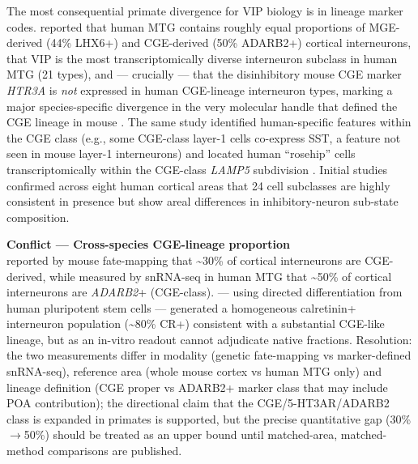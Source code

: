 \documentclass[11pt]{article}
\let\origrightarrow\rightarrow
\def\rightarrow{\ensuremath{\origrightarrow}}
\begin{document}
The most consequential primate divergence for VIP biology is in lineage marker codes. \citet{Hodge2019} reported that human MTG contains roughly equal proportions of MGE-derived (44\% LHX6+) and CGE-derived (50\% ADARB2+) cortical interneurons, that VIP is the most transcriptomically diverse interneuron subclass in human MTG (21 types), and --- crucially --- that the disinhibitory mouse CGE marker \textit{HTR3A} is \textit{not} expressed in human CGE-lineage interneuron types, marking a major species-specific divergence in the very molecular handle that defined the CGE lineage in mouse \citep{Hodge2019}. The same study identified human-specific features within the CGE class (e.g., some CGE-class layer-1 cells co-express SST, a feature not seen in mouse layer-1 interneurons) and located human ``rosehip'' cells transcriptomically within the CGE-class \textit{LAMP5} subdivision \citep{Hodge2019}. Initial studies \citep{Jorstad2023b} confirmed across eight human cortical areas that 24 cell subclasses are highly consistent in presence but show areal differences in inhibitory-neuron sub-state composition.

\begin{framed}
\textbf{Conflict --- Cross-species CGE-lineage proportion}\\
\citet{Miyoshi2010} reported by mouse fate-mapping that {\textasciitilde}30\% of cortical interneurons are CGE-derived, while \citet{Hodge2019} measured by snRNA-seq in human MTG that {\textasciitilde}50\% of cortical interneurons are \textit{ADARB2}+ (CGE-class). \citet{Du2025} --- using directed differentiation from human pluripotent stem cells --- generated a homogeneous calretinin+ interneuron population ({\textasciitilde}80\% CR+) consistent with a substantial CGE-like lineage, but as an in-vitro readout cannot adjudicate native fractions. Resolution: the two measurements differ in modality (genetic fate-mapping vs marker-defined snRNA-seq), reference area (whole mouse cortex vs human MTG only) and lineage definition (CGE proper vs ADARB2+ marker class that may include POA contribution); the directional claim that the CGE/5-HT3AR/ADARB2 class is expanded in primates is supported, but the precise quantitative gap (30\% \rightarrow 50\%) should be treated as an upper bound until matched-area, matched-method comparisons are published.
\end{framed}
\end{document}
